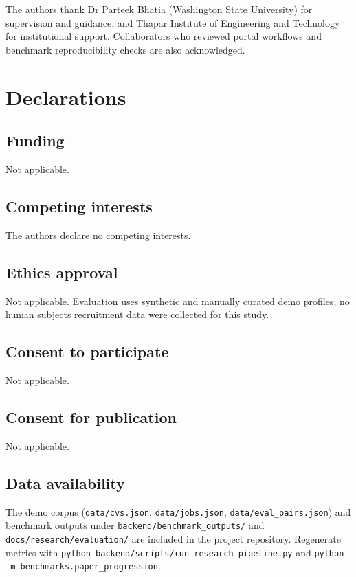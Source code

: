 \backmatter


The authors thank Dr Parteek Bhatia (Washington State University) for supervision and guidance, and Thapar Institute of Engineering and Technology for institutional support.
Collaborators who reviewed portal workflows and benchmark reproducibility checks are also acknowledged.

\section*{Declarations}

\subsection*{Funding}
Not applicable.

\subsection*{Competing interests}
The authors declare no competing interests.

\subsection*{Ethics approval}
Not applicable.
Evaluation uses synthetic and manually curated demo profiles; no human subjects recruitment data were collected for this study.

\subsection*{Consent to participate}
Not applicable.

\subsection*{Consent for publication}
Not applicable.

\subsection*{Data availability}
The demo corpus (\texttt{data/cvs.json}, \texttt{data/jobs.json}, \texttt{data/eval\_pairs.json}) and benchmark outputs under \texttt{backend/benchmark\_outputs/} and \texttt{docs/research/evaluation/} are included in the project repository.
Regenerate metrics with \texttt{python backend/scripts/run\_research\_pipeline.py} and \texttt{python -m benchmarks.paper\_progression}.

